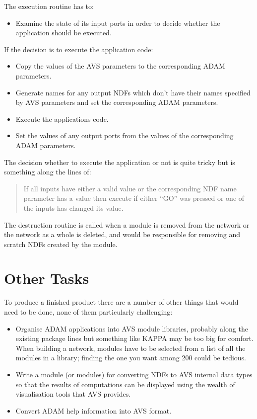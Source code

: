 The execution routine has to:
\begin{itemize}

\item Examine the state of its input ports in order to decide whether the
  application should be executed.

\end{itemize}
If the decision is to execute the application code:
\begin{itemize}

\item Copy the values of the AVS parameters to the corresponding ADAM parameters.

\item Generate names for any output NDFs which don't have their names specified
  by AVS parameters and set the corresponding ADAM parameters.

\item Execute the applications code.

\item Set the values of any output ports from the values of the corresponding ADAM
  parameters.

\end{itemize}
The decision whether to execute the application or not is quite tricky but is
something along the lines of:
\begin{quote}
	If all inputs have either a valid value or the corresponding NDF
	name parameter has a value then execute if either ``GO'' was
	pressed or one of the inputs has changed its value.
\end{quote}

The destruction routine is called when a module is removed from the network or
the network as a whole is deleted, and would be responsible for removing and
scratch NDFs created by the module.

\section{Other Tasks}

To produce a finished product there are a number of other things that would need
to be done, none of them particularly challenging:

\begin{itemize}

\item Organise ADAM applications into AVS module libraries, probably along the
  existing package lines but something like KAPPA may be too big for comfort.
  When building a network, modules have to be selected from a list of all the
  modules in a library; finding the one you want among 200 could be tedious.

\item Write a module (or modules) for converting NDFs to AVS internal data types so
  that the results of computations can be displayed using the wealth of
  visualisation tools that AVS provides.

\item Convert ADAM help information into AVS format.

\end{itemize}

